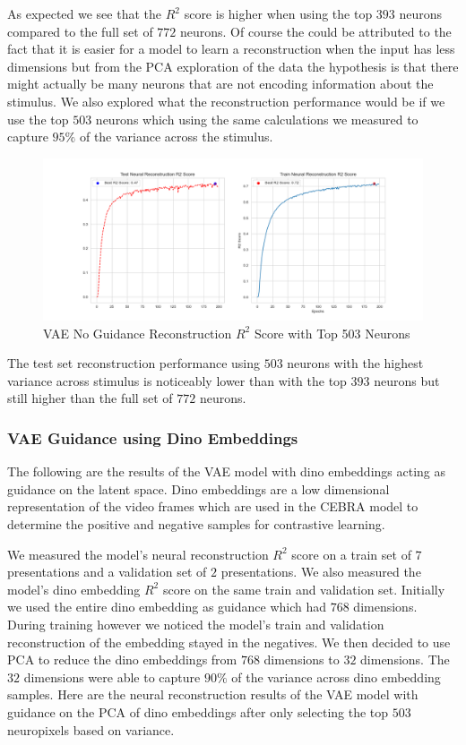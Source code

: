 \documentclass[12pt, letterpaper]{article}
\begin{document}
As expected we see that the $R^2$ score is higher when using the top $393$ neurons compared to the full set of $772$ neurons. Of course the could be attributed to the fact that it is easier for a model to learn a reconstruction when the input has less dimensions but from the PCA exploration of the data the hypothesis is that there might actually be many neurons that are not encoding information about the stimulus. We also explored what the reconstruction performance would be if we use the top $503$ neurons which using the same calculations we measured to capture $95\%$ of the variance across the stimulus.

\begin{figure}[H]
    \centering
    \includegraphics[width=1.0\textwidth]{x_r2_128dim_503_top_var_200_epochs_0.05_beta_2_layer.png}
    \caption{VAE No Guidance Reconstruction $R^2$ Score with Top 503 Neurons}
    \label{fig:vae_no_guidance_top503}
\end{figure}

The test set reconstruction performance using $503$ neurons with the highest variance across stimulus is noticeably lower than with the top $393$ neurons but still higher than the full set of $772$ neurons. 

\subsubsection{VAE Guidance using Dino Embeddings}
\label{subsubsec:vae_guidance_dino}
The following are the results of the VAE model with dino embeddings acting as guidance on the latent space. Dino embeddings are a low dimensional representation of the video frames which are used in the CEBRA model to determine the positive and negative samples for contrastive learning.

We measured the model's neural reconstruction $R^2$ score on a train set of $7$ presentations and a validation set of $2$ presentations. We also measured the model's dino embedding $R^2$ score on the same train and validation set. Initially we used the entire dino embedding as guidance which had $768$ dimensions. During training however we noticed the model's train and validation reconstruction of the embedding stayed in the negatives. We then decided to use PCA to reduce the dino embeddings from $768$ dimensions to $32$ dimensions. The $32$ dimensions were able to capture $90\%$ of the variance across dino embedding samples. Here are the neural reconstruction results of the VAE model with guidance on the PCA of dino embeddings after only selecting the top $503$ neuropixels based on variance.
\end{document}
